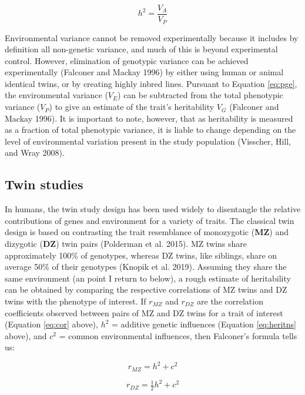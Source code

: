 \documentclass[
]{book}
\begin{document}
\begin{equation}
h^2 = \frac{V_A}{V_P} \label{eq:heritns}
\end{equation}

Environmental variance cannot be removed experimentally because it includes by definition all non-genetic variance, and much of this is beyond experimental control. However, elimination of genotypic variance can be achieved experimentally (Falconer and Mackay 1996) by either using human or animal identical twins, or by creating highly inbred lines. Pursuant to Equation \eqref{eq:pge}, the environmental variance (\(V_E\)) can be subtracted from the total phenotypic variance (\(V_P\)) to give an estimate of the trait's heritability \(V_G\) (Falconer and Mackay 1996). It is important to note, however, that as heritability is measured as a fraction of total phenotypic variance, it is liable to change depending on the level of environmental variation present in the study population (Visscher, Hill, and Wray 2008).

\hypertarget{twin-studies}{%
\subsection{Twin studies}\label{twin-studies}}

In humans, the twin study design has been used widely to disentangle the relative contributions of genes and environment for a variety of traits. The classical twin design is based on contrasting the trait resemblance of monozygotic (\textbf{MZ}) and dizygotic (\textbf{DZ}) twin pairs (Polderman et al. 2015). MZ twins share approximately 100\% of genotypes, whereas DZ twins, like siblings, share on average 50\% of their genotypes (Knopik et al. 2019). Assuming they share the same environment (an point I return to below), a rough estimate of heritability can be obtained by comparing the respective correlations of MZ twins and DZ twins with the phenotype of interest. If \(r_{MZ}\) and \(r_{DZ}\) are the correlation coefficients observed between pairs of MZ and DZ twins for a trait of interest (Equation \eqref{eq:cor} above), \(h^2\) = additive genetic influences (Equation \eqref{eq:heritns} above), and \(c^2\) = common environmental influences, then Falconer's formula tells us:

\begin{equation}
r_{MZ} = h^2 + c^2
\end{equation}

\begin{equation}
r_{DZ} = \tfrac{1}{2}h^2 + c^2
\end{equation}
\end{document}
